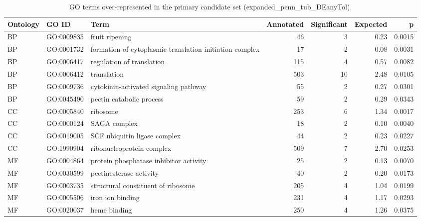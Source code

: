 \begin{table}

\caption{GO terms over-represented in the primary candidate set (expanded_penn_tub_DEanyTol).}
\centering
\begin{tabular}[t]{lllrrrr}
\toprule
Ontology & GO ID & Term & Annotated & Significant & Expected & p\\
\midrule
BP & GO:0009835 & fruit ripening & 46 & 3 & 0.23 & 0.0015\\
BP & GO:0001732 & formation of cytoplasmic translation initiation complex & 17 & 2 & 0.08 & 0.0031\\
BP & GO:0006417 & regulation of translation & 115 & 4 & 0.57 & 0.0082\\
BP & GO:0006412 & translation & 503 & 10 & 2.48 & 0.0105\\
BP & GO:0009736 & cytokinin-activated signaling pathway & 55 & 2 & 0.27 & 0.0301\\
BP & GO:0045490 & pectin catabolic process & 59 & 2 & 0.29 & 0.0343\\
CC & GO:0005840 & ribosome & 253 & 6 & 1.34 & 0.0017\\
CC & GO:0000124 & SAGA complex & 18 & 2 & 0.10 & 0.0040\\
CC & GO:0019005 & SCF ubiquitin ligase complex & 44 & 2 & 0.23 & 0.0227\\
CC & GO:1990904 & ribonucleoprotein complex & 509 & 7 & 2.70 & 0.0253\\
MF & GO:0004864 & protein phosphatase inhibitor activity & 25 & 2 & 0.13 & 0.0070\\
MF & GO:0030599 & pectinesterase activity & 40 & 2 & 0.20 & 0.0173\\
MF & GO:0003735 & structural constituent of ribosome & 205 & 4 & 1.04 & 0.0199\\
MF & GO:0005506 & iron ion binding & 231 & 4 & 1.17 & 0.0293\\
MF & GO:0020037 & heme binding & 250 & 4 & 1.26 & 0.0375\\
\bottomrule
\end{tabular}
\end{table}
